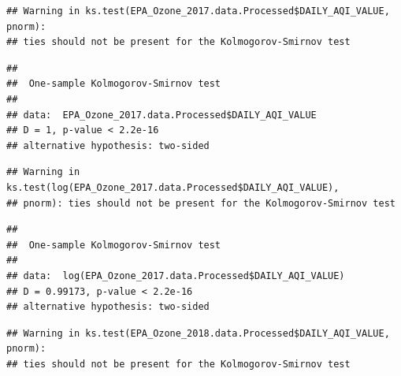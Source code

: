 \documentclass[12pt,]{article}
\newenvironment{Shaded}{\begin{snugshade}}{\end{snugshade}}
\newcommand{\KeywordTok}[1]{\textcolor[rgb]{0.13,0.29,0.53}{\textbf{#1}}}
\newcommand{\FloatTok}[1]{\textcolor[rgb]{0.00,0.00,0.81}{#1}}
\newcommand{\CommentTok}[1]{\textcolor[rgb]{0.56,0.35,0.01}{\textit{#1}}}
\newcommand{\OperatorTok}[1]{\textcolor[rgb]{0.81,0.36,0.00}{\textbf{#1}}}
\newcommand{\NormalTok}[1]{#1}
\begin{document}
\begin{Shaded}
\end{Shaded}

\begin{verbatim}
## Warning in ks.test(EPA_Ozone_2017.data.Processed$DAILY_AQI_VALUE, pnorm):
## ties should not be present for the Kolmogorov-Smirnov test
\end{verbatim}

\begin{verbatim}
## 
##  One-sample Kolmogorov-Smirnov test
## 
## data:  EPA_Ozone_2017.data.Processed$DAILY_AQI_VALUE
## D = 1, p-value < 2.2e-16
## alternative hypothesis: two-sided
\end{verbatim}

\begin{Shaded}
\end{Shaded}

\begin{verbatim}
## Warning in ks.test(log(EPA_Ozone_2017.data.Processed$DAILY_AQI_VALUE),
## pnorm): ties should not be present for the Kolmogorov-Smirnov test
\end{verbatim}

\begin{verbatim}
## 
##  One-sample Kolmogorov-Smirnov test
## 
## data:  log(EPA_Ozone_2017.data.Processed$DAILY_AQI_VALUE)
## D = 0.99173, p-value < 2.2e-16
## alternative hypothesis: two-sided
\end{verbatim}

\begin{Shaded}
\end{Shaded}

\begin{verbatim}
## Warning in ks.test(EPA_Ozone_2018.data.Processed$DAILY_AQI_VALUE, pnorm):
## ties should not be present for the Kolmogorov-Smirnov test
\end{verbatim}
\end{document}
